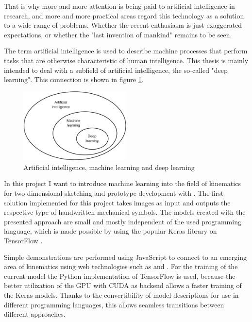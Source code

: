 That is why more and more attention is being paid to artificial intelligence in research, and more and more practical areas regard this technology as a solution to a wide range of problems.
Whether the recent enthusiasm is just exaggerated expectations, or whether the "last invention of mankind" \cite{Good1965} remains to be seen.

The term artificial intelligence is used to describe machine processes that perform tasks that are otherwise characteristic of human intelligence.
This thesis is mainly intended to deal with a subfield of artificial intelligence, the so-called "deep learning".
This connection is shown in figure \ref{fig:ai_ml_dl}.

\begin{figure}
    \includegraphics[width=0.5\textwidth]{images/ai_ml_dl.png}
    \caption{Artificial intelligence, machine learning and deep learning \cite[p.4]{Chollet2017}}
    \label{fig:ai_ml_dl}
\end{figure}

In this project I want to introduce machine learning into the field of kinematics for two-dimensional sketching and prototype development with .
The first solution implemented for this project takes images as input and outputs the respective type of handwritten mechanical symbols.
The models created with the presented approach are small and mostly independent of the used programming language, which is made possible by using the popular Keras \cite{Chollet} library on TensorFlow \cite{Google2019}.

Simple demonstrations are performed using JavaScript to connect to an emerging area of kinematics using web technologies such as  \cite{Goessner2019} and  \cite{Uhlig2019}.
For the training of the current model the Python implementation of TensorFlow is used, because the better utilization of the GPU with CUDA \cite{nvidia2019} as backend allows a faster training of the Keras models.
Thanks to the convertibility of model descriptions for use in different programming languages, this allows seamless transitions between different approaches.

